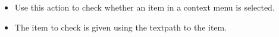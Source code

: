 
\begin{itemize}
\item Use this action to check whether an item in a context menu is selected.
\item The item to check is given using the textpath to the item. 
\end{itemize}



